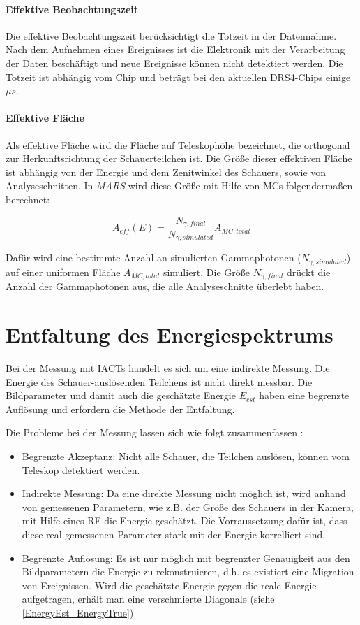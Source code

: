 \paragraph{Effektive Beobachtungszeit}
Die effektive Beobachtungszeit berücksichtigt die Totzeit in der Datennahme.
Nach dem Aufnehmen eines Ereignisses ist die Elektronik mit der Verarbeitung der Daten beschäftigt und neue Ereignisse können nicht detektiert werden.
Die Totzeit ist abhängig vom Chip und beträgt bei den aktuellen DRS4-Chips einige $\mu s$.\cite{Lichtkurve}

\paragraph{Effektive Fläche}
Als effektive Fläche wird die Fläche auf Teleskophöhe bezeichnet, die orthogonal zur Herkunftsrichtung der Schauerteilchen ist.
Die Größe dieser effektiven Fläche ist abhängig von der Energie und dem Zenitwinkel des Schauers, sowie von Analyseschnitten.
In \textit{MARS} wird diese Größe mit Hilfe von MCs folgendermaßen berechnet:

\begin{equation}
 A_{eff}(E)=\frac{N_{\gamma, final}}{N_{\gamma, simulated}}A_{MC, total}
\end{equation}

Dafür wird eine bestimmte Anzahl an simulierten Gammaphotonen ($N_{\gamma, simulated}$) auf einer uniformen Fläche $A_{MC,total}$ simuliert. 
Die Größe $N_{\gamma, final}$ drückt die Anzahl der Gammaphotonen aus, die alle Analyseschnitte überlebt haben.\cite{Lichtkurve}


\section{Entfaltung des Energiespektrums}
\label{sec:Unfolding}
Bei der Messung mit IACTs handelt es sich um eine indirekte Messung.
Die Energie des Schauer-auslösenden Teilchens ist nicht direkt messbar.
Die Bildparameter und damit auch die geschätzte Energie $E_{est}$ haben eine begrenzte Auflösung und erfordern die Methode der Entfaltung.

Die Probleme bei der Messung lassen sich wie folgt zusammenfassen \cite{UnfoldingTheorie}:

\begin{itemize}
 \item Begrenzte Akzeptanz: Nicht alle Schauer, die Teilchen auslösen, können vom Teleskop detektiert werden.
 \item Indirekte Messung: Da eine direkte Messung nicht möglich ist, wird anhand von gemessenen Parametern, wie z.B. der Größe des Schauers in der Kamera, mit Hilfe eines RF die Energie geschätzt.
       Die Vorraussetzung dafür ist, dass diese real gemessenen Parameter stark mit der Energie korrelliert sind.
 \item Begrenzte Auflösung: Es ist nur möglich mit begrenzter Genauigkeit aus den Bildparametern die Energie zu rekonstruieren, d.h. es existiert eine Migration von Ereignissen.
       Wird die geschätzte Energie gegen die reale Energie aufgetragen, erhält man eine verschmierte Diagonale (siehe \autoref{EnergyEst_EnergyTrue})
\end{itemize}


